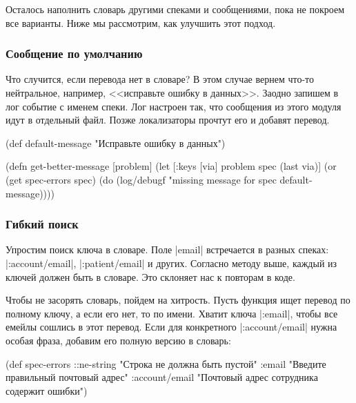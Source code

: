 Осталось наполнить словарь другими спеками и сообщениями, пока не покроем все
варианты. Ниже мы рассмотрим, как улучшить этот подход.

\subsubsection{Сообщение по умолчанию}

Что случится, если перевода нет в словаре? В этом случае вернем что-то
нейтральное, например, <<исправьте ошибку в данных>>. Заодно запишем в лог
событие с именем спеки. Лог настроен так, что сообщения из этого модуля идут в
отдельный файл. Позже локализаторы прочтут его и добавят перевод.

  \begin{clojure}
(def default-message
  "Исправьте ошибку в данных")

(defn get-better-message [problem]
  (let [{:keys [via]} problem
        spec (last via)]
    (or (get spec-errors spec)
        (do (log/debugf "missing message for spec %
            default-message))))
  \end{clojure}

\subsubsection{Гибкий поиск}

Упростим поиск ключа в словаре. Поле \spverb|email| встречается в разных спеках:
\spverb|:account/email|, \spverb|:patient/email| и других. Согласно методу выше,
каждый из ключей должен быть в словаре. Это склоняет нас к повторам в коде.

Чтобы не засорять словарь, пойдем на хитрость. Пусть функция ищет перевод по
полному ключу, а если его нет, то по имени. Хватит ключа \spverb|:email|, чтобы
все емейлы сошлись в этот перевод. Если для конкретного \spverb|:account/email|
нужна особая фраза, добавим его полную версию в словарь:

  \begin{clojure}
(def spec-errors
  {::ne-string "Строка не должна быть пустой"
   :email "Введите правильный почтовый адрес"
   :account/email "Почтовый адрес сотрудника содержит ошибки"})
  \end{clojure}

